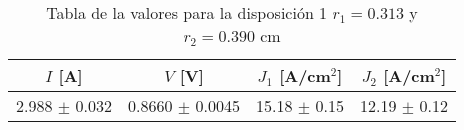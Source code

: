 \begin{table}[H]
    \centering
\begin{tabular}{cccc}
\toprule
$I$ [A] & $V$ [V] & $J_1$ [A/cm$^2$] & $J_2$ [A/cm$^2$] \\
\midrule
2.988 $\pm$ 0.032 & 0.8660 $\pm$ 0.0045 & 15.18 $\pm$ 0.15 & 12.19 $\pm$ 0.12 \\
\bottomrule
\end{tabular}
    \caption{Tabla de la valores para la disposición 1 $r_1=0.313$ y $r_2=0.390$ cm }
    \label{Tab:VIJ_mini_1}
\end{table}
